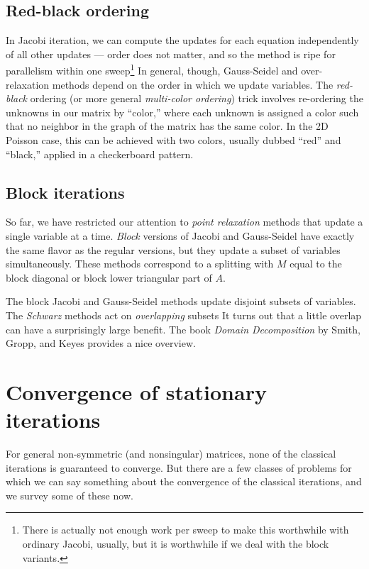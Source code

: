 \documentclass[12pt, leqno]{article} %
\begin{document}
\subsection{Red-black ordering}

In Jacobi iteration, we can compute the updates for each equation
independently of all other updates --- order does not matter, and so the
method is ripe for parallelism within one sweep\footnote{%
  There is actually not enough work per sweep to make this worthwhile
  with ordinary Jacobi, usually, but it is worthwhile if we deal
  with the block variants.
}
In general, though, Gauss-Seidel and over-relaxation methods depend
on the order in which we update variables.  The {\em red-black} ordering
(or more general {\em multi-color ordering}) trick involves re-ordering
the unknowns in our matrix by ``color,'' where each unknown is assigned
a color such that no neighbor in the graph of the matrix has the same
color.  In the 2D Poisson case, this can be achieved with two colors,
usually dubbed ``red'' and ``black,'' applied in a checkerboard pattern.

\subsection{Block iterations}

So far, we have restricted our attention to {\em point relaxation} methods
that update a single variable at a time.  {\em Block} versions of Jacobi and
Gauss-Seidel have exactly the same flavor as the regular versions, but they
update a subset of variables simultaneously.  These methods correspond to a
splitting with $M$ equal to the block diagonal or block lower triangular part
of $A$.

The block Jacobi and Gauss-Seidel methods update disjoint subsets of
variables.  The {\em Schwarz} methods act on {\em overlapping} subsets
It turns out that a little overlap can have a surprisingly large benefit.
The book {\em Domain Decomposition} by Smith, Gropp, and Keyes provides a
nice overview.

\section{Convergence of stationary iterations}

For general non-symmetric (and nonsingular) matrices, none of
the classical iterations is guaranteed to converge.
But there are a few classes of problems for which we can say something
about the convergence of the classical iterations, and we survey some
of these now.
\end{document}
